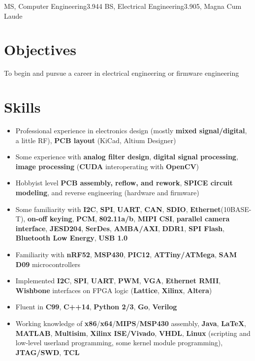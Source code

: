 \documentclass{my_resume}
\begin{document}

    {MS, Computer Engineering}{3.944}
	{BS, Electrical Engineering}{3.905, Magna Cum Laude}

\section{Objectives}
To begin and pursue a career in electrical engineering or firmware engineering

\section{Skills}
\begin{itemize}[noitemsep]
    \item Professional experience in electronics design (mostly \textbf{mixed signal/digital}, a little RF), \textbf{PCB layout} (KiCad, Altium Designer)
    \item Some experience with \textbf{analog filter design}, \textbf{digital signal processing}, \textbf{image processing} (\textbf{CUDA} interoperating with \textbf{OpenCV})
    \item Hobbyist level \textbf{PCB assembly, reflow, and rework}, \textbf{SPICE circuit modeling}, and reverse engineering (hardware and firmware)
    \item Some familiarity with \textbf{I2C}, \textbf{SPI}, \textbf{UART}, \textbf{CAN}, \textbf{SDIO}, \textbf{Ethernet}(10BASE-T), \textbf{on-off keying}, \textbf{PCM}, \textbf{802.11a/b}, \textbf{MIPI CSI}, \textbf{parallel camera interface}, \textbf{JESD204}, \textbf{SerDes}, \textbf{AMBA/AXI}, \textbf{DDR1}, \textbf{SPI Flash}, \textbf{Bluetooth Low Energy}, \textbf{USB 1.0}
    \item Familiarity with \textbf{nRF52}, \textbf{MSP430}, \textbf{PIC12}, \textbf{ATTiny/ATMega}, \textbf{SAM D09} microcontrollers
    \item Implemented \textbf{I2C}, \textbf{SPI}, \textbf{UART}, \textbf{PWM}, \textbf{VGA}, \textbf{Ethernet RMII}, \textbf{Wishbone} interfaces on FPGA logic (\textbf{Lattice}, \textbf{Xilinx}, \textbf{Altera})
    \item Fluent in \textbf{C99}, \textbf{C++14}, \textbf{Python 2/3}, \textbf{Go}, \textbf{Verilog}
    \item Working knowledge of \textbf{x86}/\textbf{x64}/\textbf{MIPS}/\textbf{MSP430} assembly, \textbf{Java}, \textbf{LaTeX}, \textbf{MATLAB}, \textbf{Multisim}, \textbf{Xilinx ISE/Vivado}, \textbf{VHDL}, \textbf{Linux} (scripting and low-level userland programming, some kernel module programming), \textbf{JTAG/SWD}, \textbf{TCL}
\end{itemize}
\end{document}
